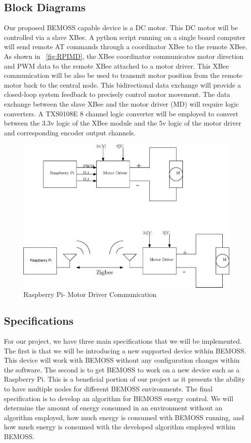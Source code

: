 \documentclass[letterpaper,12pt]{article}   %
\begin{document}
\subsection{Block Diagrams}
Our proposed BEMOSS capable device is a DC motor. This DC motor will be controlled via a slave XBee. A python script running on a single board computer will send remote AT commands through a coordinator XBee to the remote XBee. As shown in ~\autoref{fig:RPIMD}, the XBee coordinator communicates motor direction and PWM data to the remote XBee attached to a motor driver. This XBee communication will be also be used to transmit motor position from the remote motor back to the central node. This bidirectional data exchange will provide a closed-loop system feedback to precisely control motor movement. The data exchange between the slave XBee and the motor driver (MD) will require logic converters. A TXS0108E 8 channel logic converter will be employed to convert between the 3.3v logic of the XBee module and the 5v logic of the motor driver and corresponding encoder output channels. 


\begin{figure}
    \centering
    \includegraphics[scale=1]{figs/ipe/RpiMDInterface.eps}
    \caption{Raspberry Pi- Motor Driver Communication}
    \label{fig:RPIMD}
\end{figure}




\subsection{Specifications}
For our project, we have three main specifications that we will be implemented. The first is that we will be introducing a new supported device within BEMOSS. This device will work with BEMOSS without any configuration changes within the software. The second is to get BEMOSS to work on a new device such as a Raspberry Pi. This is a beneficial portion of our project as it presents the ability to have multiple nodes for different BEMOSS environments. The final specification is to develop an algorithm for BEMOSS energy control. We will determine the amount of energy consumed in an environment without an algorithm employed, how much energy is consumed with BEMOSS running, and how much energy is consumed with the developed algorithm employed within BEMOSS.
\end{document}
